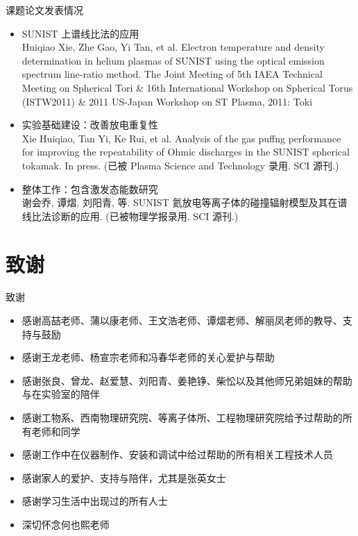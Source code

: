 \begin{CJK*}{UTF8}{kai}
\begin{frame}{课题论文发表情况}
	\small{
	\begin{itemize}
		\item SUNIST 上谱线比法的应用\\
			{\tiny Huiqiao Xie, Zhe Gao, Yi Tan, et al. Electron temperature and density determination in helium plasmas of SUNIST using the optical emission spectrum line-ratio method. The Joint Meeting of 5th IAEA Technical Meeting on Spherical Tori \& 16th International Workshop on Spherical Torus (\alert{ISTW2011}) \& 2011 US-Japan Workshop on ST Plasma, 2011: Toki}
		\item 实验基础建设：改善放电重复性\\
			{\tiny Xie Huiqiao, Tan Yi, Ke Rui, et al. Analysis of the gas puffng performance for improving the repeatability of Ohmic discharges in the SUNIST spherical tokamak. In press. (\alert{已被 Plasma Science and Technology 录用. SCI 源刊.})}
		\item 整体工作：包含激发态能数研究\\
			{\tiny 谢会乔, 谭熠, 刘阳青, 等. SUNIST 氦放电等离子体的碰撞辐射模型及其在谱线比法诊断的应用. (\alert{已被物理学报录用. SCI 源刊.})}
	\end{itemize}
	}
\end{frame}

\section{致谢}
\begin{frame}{致谢}
	\begin{itemize}
		\item 感谢高喆老师、蒲以康老师、王文浩老师、谭熠老师、解丽凤老师的教导、支持与鼓励
		\item 感谢王龙老师、杨宣宗老师和冯春华老师的关心爱护与帮助
		\item 感谢张良、曾龙、赵爱慧、刘阳青、姜艳铮、柴忪以及其他师兄弟姐妹的帮助与在实验室的陪伴
		\item 感谢工物系、西南物理研究院、等离子体所、工程物理研究院给予过帮助的所有老师和同学
		\item 感谢工作中在仪器制作、安装和调试中给过帮助的所有相关工程技术人员
		\item 感谢家人的爱护、支持与陪伴，尤其是张英女士
		\item 感谢学习生活中出现过的所有人士
		\item 深切怀念何也熙老师
	\end{itemize}
\end{frame}
\appendix


\end{CJK*}
